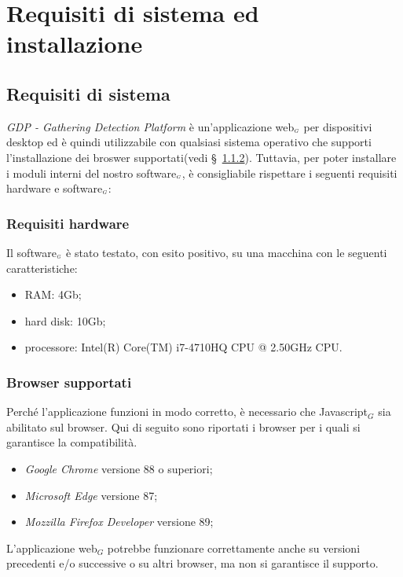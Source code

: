 \chapter{Requisiti di sistema ed installazione}\label{RequisitiDiSistemaEdInstallazione}

\section{Requisiti di sistema}\label{RequisitiDiSistemaEdInstallazioneRequisiti}
\textit{GDP - Gathering Detection Platform} è un'applicazione web$_{\scaleto{G}{3pt}}$ per dispositivi desktop ed è quindi utilizzabile con qualsiasi sistema operativo che supporti l'installazione dei broswer supportati(vedi \S~\ref{RequisitiDiSistemaEdInstallazioneRequisitiBrowserSupportati}). Tuttavia, per poter installare i moduli interni del nostro software$_{\scaleto{G}{3pt}}$, è consigliabile rispettare i seguenti requisiti hardware e software$_{\scaleto{G}{3pt}}$:

\subsection{Requisiti hardware}\label{RequisitiDiSistemaEdInstallazioneRequisitiRequisitiHardware}

Il software$_{\scaleto{G}{3pt}}$ è stato testato, con esito positivo, su una macchina con le seguenti caratteristiche:
\begin{itemize}
	\item RAM: 4Gb;
	\item hard disk: 10Gb;
	\item processore: Intel(R) Core(TM) i7-4710HQ CPU @ 2.50GHz CPU.
\end{itemize}

\subsection{Browser supportati}\label{RequisitiDiSistemaEdInstallazioneRequisitiBrowserSupportati}
Perché l'applicazione funzioni in modo corretto, è necessario che Javascript$_G$ sia abilitato sul browser. 
Qui di seguito sono riportati i browser per i quali si garantisce la compatibilità. 
\begin{itemize}
	\item \textit{Google Chrome} versione 88 o superiori;
	\item \textit{Microsoft Edge} versione 87;
	\item \textit{Mozzilla Firefox Developer} versione 89;
\end{itemize}
L'applicazione web$_G$ potrebbe funzionare correttamente anche su versioni precedenti e/o successive o su altri browser, ma non si garantisce il supporto. 

